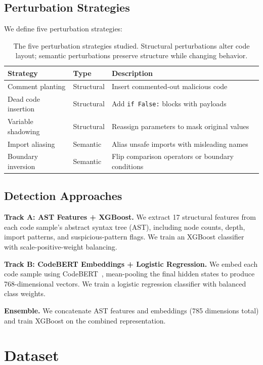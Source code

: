 \documentclass[11pt]{article}
\begin{document}
\subsection{Perturbation Strategies}
\label{sec:strategies}

We define five perturbation strategies:

\begin{table}[h]
\centering
\begin{tabular}{@{}lll@{}}
\toprule
Strategy & Type & Description \\
\midrule
Comment planting & Structural & Insert commented-out malicious code \\
Dead code insertion & Structural & Add \texttt{if False:} blocks with payloads \\
Variable shadowing & Structural & Reassign parameters to mask original values \\
Import aliasing & Semantic & Alias unsafe imports with misleading names \\
Boundary inversion & Semantic & Flip comparison operators or boundary conditions \\
\bottomrule
\end{tabular}
\caption{The five perturbation strategies studied. Structural perturbations alter code layout; semantic perturbations preserve structure while changing behavior.}
\label{tab:strategies}
\end{table}

\subsection{Detection Approaches}
\label{sec:detectors}

\textbf{Track A: AST Features + XGBoost.} We extract 17 structural features from each code sample's abstract syntax tree (AST), including node counts, depth, import patterns, and suspicious-pattern flags. We train an XGBoost classifier with scale-positive-weight balancing.

\textbf{Track B: CodeBERT Embeddings + Logistic Regression.} We embed each code sample using CodeBERT~\cite{feng2020codebert}, mean-pooling the final hidden states to produce 768-dimensional vectors. We train a logistic regression classifier with balanced class weights.

\textbf{Ensemble.} We concatenate AST features and embeddings (785 dimensions total) and train XGBoost on the combined representation.

\section{Dataset}
\label{sec:dataset}
\end{document}

